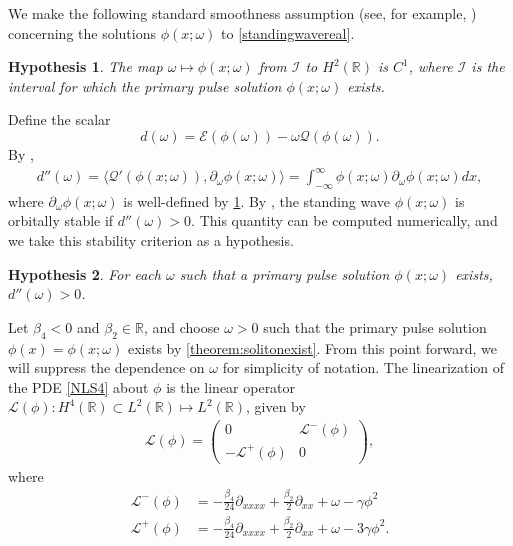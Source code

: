 \documentclass[12pt]{elsarticle}
\def\noi{\noindent}
\def\R{{\mathbb R}}
\def\calE{{\mathcal E}}
\def\calQ{{\mathcal Q}}
\def\calL{{\mathcal L}}
\def\calI{{\mathcal I}}
\newtheorem{hypothesis}{Hypothesis}
\begin{document}
\noi We make the following standard smoothness assumption (see, for example, \cite[Assumption 2]{Grillakis1987}) concerning the solutions $\phi(x; \omega)$ to \cref{standingwavereal}.

\begin{hypothesis}\label{hyp:smoothmap}
The map $\omega \mapsto \phi(x; \omega)$ from $\calI$ to $H^2(\R)$ is $C^1$, where $\calI$ is the interval for which the primary pulse solution $\phi(x; \omega)$ exists.
\end{hypothesis}

Define the scalar
\begin{equation}
d(\omega) = \calE(\phi(\omega)) - \omega\calQ(\phi(\omega)).
\end{equation}
By \cite[(2.21)]{Grillakis1987},
\begin{align}\label{ddoubleprime}
d''(\omega) = \langle \calQ'(\phi(x; \omega)), \partial_\omega \phi(x; \omega) \rangle
= \int_{-\infty}^\infty \phi(x; \omega) \partial_\omega \phi(x; \omega) dx,
\end{align}
where $\partial_\omega \phi(x; \omega)$ is well-defined by \cref{hyp:smoothmap}. By \cite[Theorem 3.5]{Grillakis1987}, the standing wave $\phi(x; \omega)$ is orbitally stable if $d''(\omega) > 0$. This quantity can be computed numerically, and we take this stability criterion as a hypothesis.

\begin{hypothesis}\label{hyp:dccpos}
For each $\omega$ such that a primary pulse solution $\phi(x; \omega)$ exists, $d''(\omega) > 0$.
\end{hypothesis}

Let $\beta_4 < 0$ and $\beta_2 \in \R$, and choose $\omega > 0$ such that the primary pulse solution $\phi(x) = \phi(x; \omega)$ exists by \cref{theorem:solitonexist}. From this point forward, we will suppress the dependence on $\omega$ for simplicity of notation. The linearization of the PDE \cref{NLS4} about $\phi$ is the linear operator $\calL(\phi): H^4(\R) \subset L^2(\R) \mapsto L^2(\R)$, given by
\begin{align}\label{defLphi}
\calL(\phi) = 
\begin{pmatrix}
0 & \calL^-(\phi) \\
-\calL^+(\phi) & 0
\end{pmatrix},
\end{align}
where
\begin{align*}
\calL^-(\phi) &= -\frac{\beta_4}{24} \partial_{xxxx} + \frac{\beta_2}{2} \partial_{xx} + \omega - \gamma \phi^2 \\
\calL^+(\phi) &= -\frac{\beta_4}{24} \partial_{xxxx} + \frac{\beta_2}{2} \partial_{xx} + \omega - 3 \gamma \phi^2.
\end{align*}
\end{document}
